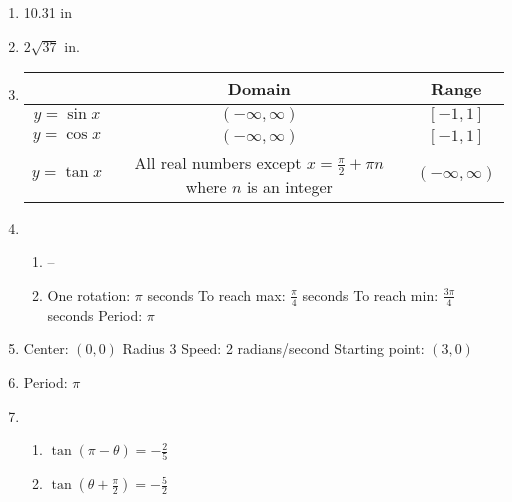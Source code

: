 \documentclass{article}
\begin{document}
\begin{enumerate}
\begin{enumerate}
	\end{enumerate}
	
\item 10.31 in

\item $2\sqrt{37}$ in.

\item

	\begin{tabular}{| c | c | c |}
	
	\hline
	& Domain & Range \\
	\hline
	$y = \sin{x}$ & $(-\infty, \infty)$ & $[-1,1]$ \\
	\hline
	$y = \cos{x}$ & $(-\infty, \infty)$ & $[-1, 1]$ \\
	\hline
	$y = \tan{x}$ & All real numbers except $x = \frac{\pi}{2} + \pi n$ where $n$ is an integer & $(-\infty, \infty)$ \\
	\hline
	
	\end{tabular}
	
\item 

	\begin{enumerate}
	
	\item -- 
	
	\item One rotation: $\pi$ seconds \newline
		To reach max: $\frac{\pi}{4}$ seconds \newline
		To reach min: $\frac{3\pi}{4}$ seconds \newline
		Period: $\pi$
	
	\end{enumerate}

\item Center: $(0,0)$ \newline
	Radius $3$ \newline
	Speed: 2 radians/second \newline
	Starting point: $(3,0)$

\item Period: $\pi$

\item
	
	\begin{enumerate}
	
	\item $\tan{(\pi - \theta)} = -\frac{2}{5}$
	
	\item $\tan{(\theta + \frac{\pi}{2})} = -\frac{5}{2}$
	

\end{enumerate}
\end{enumerate}
\end{document}
